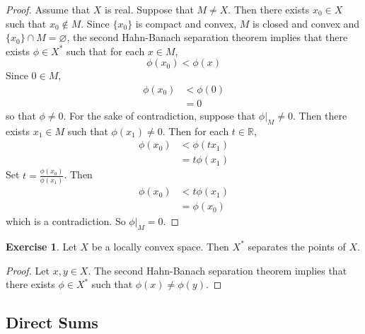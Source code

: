 \documentclass[12pt]{amsart}
\theoremstyle{definition}
\newtheorem{ex}[definition]{Exercise}
\newcommand{\R}{\mathbb{R}}
\begin{document}
	\begin{proof}
		Assume that $X$ is real. Suppose that $M \neq X$. Then there exists $x_0 \in X$ such that $x_0 \not \in M$. Since $\{x_0\}$ is compact and convex, $M$ is closed and convex and $\{x_0\} \cap M = \varnothing$, the second Hahn-Banach separation theorem implies that there exists $\phi \in X^*$ such that for each $x \in M$, $$\phi(x_0) < \phi(x)$$
		Since $0 \in M$, 
		\begin{align*}
			\phi(x_0)
			&< \phi(0) \\
			&= 0
		\end{align*}
	so that $\phi \neq 0$. For the sake of contradiction, suppose that $\phi|_M \neq 0$. Then there exists $x_1 \in M$ such that $\phi(x_1) \neq 0$. Then for each $t \in \R$, 
	\begin{align*}
		\phi(x_0) 
		&< \phi(tx_1) \\
		&= t \phi(x_1)
	\end{align*}
	Set $t = \frac{\phi(x_0)}{\phi(x_1)}$. Then 
	\begin{align*}
		\phi(x_0) 
		&< t \phi(x_1) \\
		&= \phi(x_0)
	\end{align*}
	which is a contradiction. So $\phi|_M = 0$.
	\end{proof}

	\begin{ex}
		Let $X$ be a locally convex space. Then $X^*$ separates the points of $X$. 
	\end{ex}

	\begin{proof}
		Let $x, y \in X$. The second Hahn-Banach separation theorem implies that there exists $\phi \in X^*$ such that $\phi(x) \neq \phi(y)$. 
	\end{proof}









	
	
	
	
	
	
	
	
	
	
	
	
	
	
	
	
	\newpage
	\subsection{Direct Sums}
\end{document}
